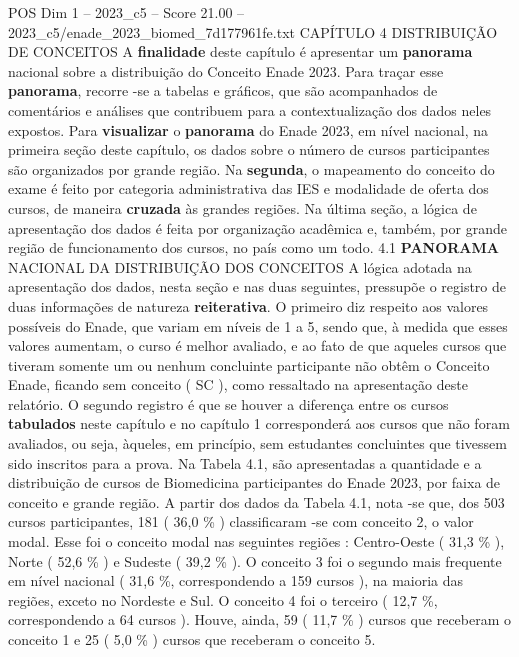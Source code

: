 \begin{textsample}{POS Dim 1 – 2023\_c5 – Score 21.00 – 2023\_c5/enade\_2023\_biomed\_7d177961fe.txt}  \label{ex:f1_pos_016}
CAPÍTULO 4 DISTRIBUIÇÃO DE CONCEITOS A \textbf{finalidade} deste capítulo é apresentar um \textbf{panorama} nacional sobre a distribuição do Conceito Enade 2023.
Para traçar esse \textbf{panorama}, recorre -se a tabelas e gráficos, que são acompanhados de comentários e análises que contribuem para a contextualização dos dados neles expostos.
Para \textbf{visualizar} o \textbf{panorama} do Enade 2023, em nível nacional, na primeira seção deste capítulo, os dados sobre o número de cursos participantes são organizados por grande região.
Na \textbf{segunda}, o mapeamento do conceito do exame é feito por categoria administrativa das IES e modalidade de oferta dos cursos, de maneira \textbf{cruzada} às grandes regiões.
Na última seção, a lógica de apresentação dos dados é feita por organização acadêmica e, também, por grande região de funcionamento dos cursos, no país como um todo. 4.1 \textbf{PANORAMA} NACIONAL DA DISTRIBUIÇÃO DOS CONCEITOS A lógica adotada na apresentação dos dados, nesta seção e nas duas seguintes, pressupõe o registro de duas informações de natureza \textbf{reiterativa}.
O primeiro diz respeito aos valores possíveis do Enade, que variam em níveis de 1 a 5, sendo que, à medida que esses valores aumentam, o curso é melhor avaliado, e ao fato de que aqueles cursos que tiveram somente um ou nenhum concluinte participante não obtêm o Conceito Enade, ficando sem conceito ( SC ), como ressaltado na apresentação deste relatório.
O segundo registro é que se houver a diferença entre os cursos \textbf{tabulados} neste capítulo e no capítulo 1 corresponderá aos cursos que não foram avaliados, ou seja, àqueles, em princípio, sem estudantes concluintes que tivessem sido inscritos para a prova.
Na Tabela 4.1, são apresentadas a quantidade e a distribuição de cursos de Biomedicina participantes do Enade 2023, por faixa de conceito e grande região.
A partir dos dados da Tabela 4.1, nota -se que, dos 503 cursos participantes, 181 ( 36,0 \% ) classificaram -se com conceito 2, o valor modal.
Esse foi o conceito modal nas seguintes regiões : Centro-Oeste ( 31,3 \% ), Norte ( 52,6 \% ) e Sudeste ( 39,2 \% ).
O conceito 3 foi o segundo mais frequente em nível nacional ( 31,6 \%, correspondendo a 159 cursos ), na maioria das regiões, exceto no Nordeste e Sul.
O conceito 4 foi o terceiro ( 12,7 \%, correspondendo a 64 cursos ).
Houve, ainda, 59 ( 11,7 \% ) cursos que receberam o conceito 1 e 25 ( 5,0 \% ) cursos que receberam o conceito 5.

\end{textsample}
